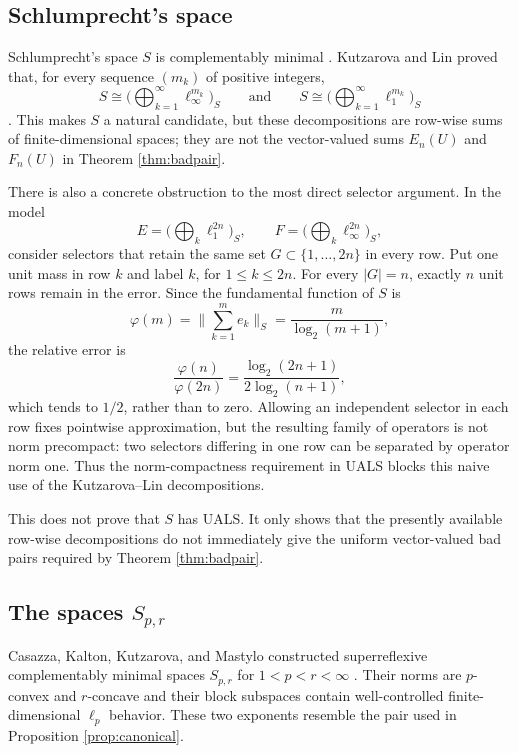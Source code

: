 \documentclass[11pt]{article}
\theoremstyle{definition}
\theoremstyle{remark}
\begin{document}
\subsection{Schlumprecht's space}

Schlumprecht's space $S$ is complementably minimal \cite{Schlumprecht}.  Kutzarova and Lin proved that, for every sequence $(m_k)$ of positive integers,
\[
  S\cong \Big(\bigoplus_{k=1}^\infty \ell_\infty^{m_k}\Big)_S
  \qquad\text{and}\qquad
  S\cong \Big(\bigoplus_{k=1}^\infty \ell_1^{m_k}\Big)_S
\]
\cite{KL}.  This makes $S$ a natural candidate, but these decompositions are row-wise sums of finite-dimensional spaces; they are not the vector-valued sums $E_n(U)$ and $F_n(U)$ in Theorem \ref{thm:badpair}.

There is also a concrete obstruction to the most direct selector argument.  In the model
\[
  E=\Big(\bigoplus_k\ell_1^{2n}\Big)_S,
  \qquad
  F=\Big(\bigoplus_k\ell_\infty^{2n}\Big)_S,
\]
consider selectors that retain the same set $G\subset\{1,\dots,2n\}$ in every row.  Put one unit mass in row $k$ and label $k$, for $1\leq k\leq2n$.  For every $|G|=n$, exactly $n$ unit rows remain in the error.  Since the fundamental function of $S$ is
\[
  \varphi(m)=\Big\|\sum_{k=1}^m e_k\Big\|_S=\frac{m}{\log_2(m+1)},
\]
the relative error is
\[
  \frac{\varphi(n)}{\varphi(2n)}
  =\frac{\log_2(2n+1)}{2\log_2(n+1)},
\]
which tends to $1/2$, rather than to zero.  Allowing an independent selector in each row fixes pointwise approximation, but the resulting family of operators is not norm precompact: two selectors differing in one row can be separated by operator norm one.  Thus the norm-compactness requirement in UALS blocks this naive use of the Kutzarova--Lin decompositions.

This does not prove that $S$ has UALS.  It only shows that the presently available row-wise decompositions do not immediately give the uniform vector-valued bad pairs required by Theorem \ref{thm:badpair}.

\subsection{The spaces $S_{p,r}$}

Casazza, Kalton, Kutzarova, and Mastylo constructed superreflexive complementably minimal spaces $S_{p,r}$ for $1<p<r<\infty$ \cite{CKKM}.  Their norms are $p$-convex and $r$-concave and their block subspaces contain well-controlled finite-dimensional $\ell_p$ behavior.  These two exponents resemble the pair used in Proposition \ref{prop:canonical}.
\end{document}
